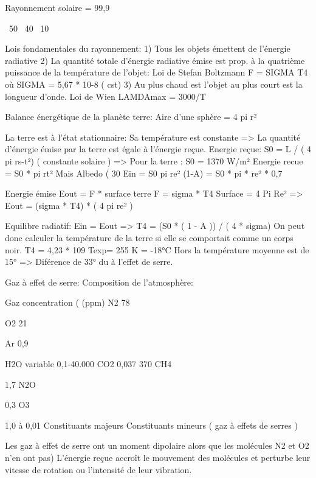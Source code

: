 Rayonnement solaire = 99,9%


~50%
~40%
~10%


Lois fondamentales du rayonnement:
1) Tous les objets émettent de l’énergie radiative
2) La quantité totale d’énergie radiative émise est prop. à la quatrième puissance de la température de l’objet:
        Loi de Stefan Boltzmann
        F = SIGMA T4
        où SIGMA = 5,67 * 10-8 ( cst)
3) Au plus chaud est l’objet au plus court est la longueur d’onde.
        Loi de Wien
        LAMDAmax = 3000/T






Balance énergétique de la planète terre:
Aire d’une sphère = 4 pi r²


La terre est à l’état stationnaire: Sa température est constante
=> La quantité d’énergie émise par la terre est égale à l’énergie reçue.
Energie reçue:
S0 = L / ( 4 pi rs-t²) ( constante solaire )
=> Pour la terre : S0 = 1370 W/m²
Energie recue = S0 * pi rt²
Mais Albedo ( 30%
Ein = S0 pi re² (1-A) = S0 * pi * re² * 0,7


Energie émise
Eout = F * surface terre
        F = sigma * T4
        Surface = 4 Pi Re²
=> Eout = (sigma * T4) * ( 4 pi re² )


Equilibre radiatif:
Ein = Eout
=> T4 = (S0 * ( 1 - A )) / ( 4 * sigma)
On peut donc calculer la température de la terre si elle se comportait comme un corps noir.
T4 = 4,23 * 109
Texp= 255 K = -18°C
Hors la température moyenne est de 15°
=> Diférence de 33° du à l’effet de serre.


Gaz à effet de serre:
Composition de l’atmosphère:


Gaz
	concentration (%
	(ppm)
	N2
	78
	

	O2
	21
	

	Ar
	0,9
	

	H2O
	variable
	0,1-40.000
	CO2
	0,037
	370
	CH4
	

	1,7
	N2O
	

	0,3
	O3
	

	1,0 à 0,01
	Constituants majeurs
Constituants mineurs ( gaz à effets de serres )


Les gaz à effet de serre ont un moment dipolaire alors que les molécules N2 et O2 n’en ont pas)
L’énergie reçue accroît le mouvement des molécules et perturbe leur vitesse de rotation ou l’intensité de leur vibration.
  





